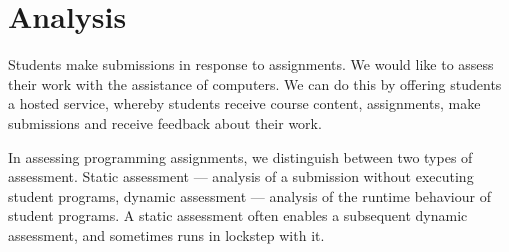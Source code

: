 
\chapter{Analysis}

\label{section:analysis}

Students make submissions in response to assignments. We would like to assess
their work with the assistance of computers. We can do this by offering
students a hosted service, whereby students receive course content,
assignments, make submissions and receive feedback about their work.

In assessing programming assignments, we distinguish between two types of
assessment. Static assessment --- analysis of a submission without executing
student programs, dynamic assessment --- analysis of the runtime behaviour of
student programs. A static assessment often enables a subsequent dynamic
assessment, and sometimes runs in lockstep with it.












